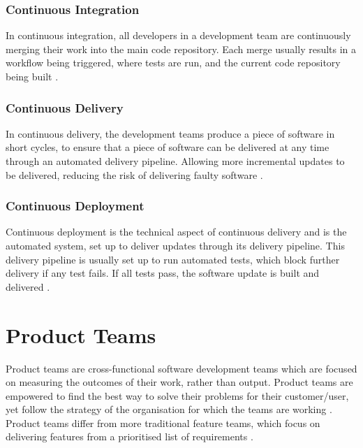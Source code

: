 \subsubsection{Continuous Integration}
In continuous integration, all developers in a development team are continuously merging their work into the main code repository. Each merge usually results in a workflow being triggered, where tests are run, and the current code repository being built \cite{continuous_integration_wiki_2023}.

\subsubsection{Continuous Delivery}
In continuous delivery, the development teams produce a piece of software in short cycles, to ensure that a piece of software can be delivered at any time through an automated delivery pipeline. Allowing more incremental updates to be delivered, reducing the risk of delivering faulty software \cite{continuous_delivery_wiki_2023}.

\subsubsection{Continuous Deployment}
Continuous deployment is the technical aspect of continuous delivery and is the automated system, set up to deliver updates through its delivery pipeline. This delivery pipeline is usually set up to run automated tests, which block further delivery if any test fails. If all tests pass, the software update is built and delivered \cite{continuous_deployment_wiki_2023}.

\section{Product Teams} \label{sec:product_teams}
Product teams are cross-functional software development teams which are focused on measuring the outcomes of their work, rather than output. Product teams are empowered to find the best way to solve their problems for their customer/user, yet follow the strategy of the organisation for which the teams are working \cite{product_teams_2019}. Product teams differ from more traditional feature teams, which focus on delivering features from a prioritised list of requirements \cite{product_teams_2019}.